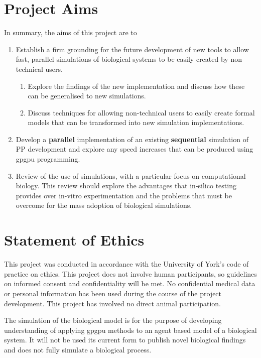 \documentclass{UoYCSproject}
\begin{document}
\section{Project Aims}
In summary, the aims of this project are to
\begin{enumerate}
	\item Establish a firm grounding for the future development of new tools to allow fast, parallel simulations of biological systems to be easily created by non-technical users.
	\begin{enumerate}
		\item Explore the findings of the new implementation and discuss how these can be generalised to new simulations.
		\item Discuss techniques for allowing non-technical users to easily create formal models that can be transformed into new simulation implementations.
	\end{enumerate}
	\item Develop a \textbf{parallel} implementation of an existing \textbf{sequential} simulation of \gls{PP} development and explore any speed increases that can be produced using \gls{gpgpu} programming.
	\item Review of the use of simulations, with a particular focus on computational biology. This review should explore the advantages that in-silico testing provides over \gls{in-vitro} experimentation and the problems that must be overcome for the mass adoption of biological simulations.
	
\end{enumerate}

\section{Statement of Ethics}
This project was conducted in accordance with the University of York's code of practice on ethics.
This project does not involve human participants, so guidelines on informed consent and confidentiality will be met. No confidential medical data or personal information has been used during the course of the project development. This project has involved no direct animal participation.

The simulation of the biological model is for the purpose of developing understanding of applying \gls{gpgpu} methods to an agent based model of a biological system. It will not be used its current form to publish novel biological findings and does not fully simulate a biological process.%
\end{document}

